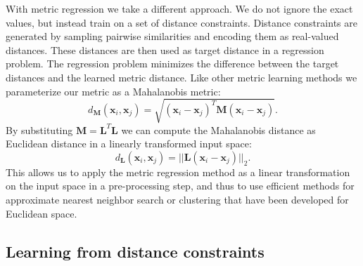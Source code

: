 \documentclass[a4paper,titlepage]{article}
\renewcommand{\vec}[1]{\mathbf{#1}}
\newcommand{\mat}[1]{\mathbf{#1}}
\begin{document}
With metric regression we take a different approach. We do not ignore the exact values, but instead train on a set of distance constraints. Distance constraints are generated by sampling pairwise similarities and encoding them as real-valued distances. These distances are then used as target distance in a regression problem. The regression problem minimizes the difference between the target distances and the learned metric distance. Like other metric learning methods we parameterize our metric as a Mahalanobis metric:  
\begin{equation}
d_{\mat{M}}(\vec{x}_i, \vec{x}_j) = \sqrt{(\vec{x}_i-\vec{x}_j)^T \mat{M} (\vec{x}_i - \vec{x}_j)}.
\label{eq:mahalanobis}
\end{equation}
By substituting $\mat{M} = \mat{L}^T \mat{L}$ we can compute the Mahalanobis distance as Euclidean distance in a linearly transformed input space:
\begin{equation}
d_{\mat{L}}(\vec{x}_i, \vec{x}_j) =  ||\mat{L} (\vec{x}_i - \vec{x}_j)||_2.
\label{eq:mahalanobis_transformation}
\end{equation}
This allows us to apply the metric regression method as a linear transformation on the input space in a pre-processing step, and thus to use efficient methods for approximate nearest neighbor search or clustering that have been developed for Euclidean space. %


\subsection{Learning from distance constraints}

\end{document}
